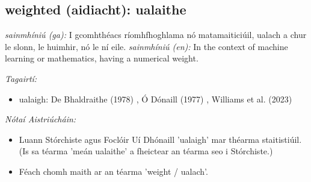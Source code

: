 \documentclass{article}
\begin{document}
\subsection*{weighted (aidiacht): ualaithe} 
 \noindent \textit{sainmhíniú (ga):} I gcomhthéacs ríomhfhoghlama nó matamaiticiúil, ualach a chur le slonn, le huimhir, nó le ní eile.
\newline\newline
 \noindent \textit{sainmhíniú (en):} In the context of machine learning or mathematics, having a numerical weight.
\newline

 \noindent \textit{Tagairtí:}
\begin{itemize}
	\item ualaigh: De Bhaldraithe (1978) \cite{de-bhaldraithe}, Ó Dónaill (1977) \cite{odonaill}, Williams et al. (2023) \cite{storchiste}
\end{itemize}

 \noindent \textit{Nótaí Aistriúcháin:}
\begin{itemize}
	\item Luann Stórchiste agus Foclóir Uí Dhónaill 'ualaigh' mar théarma staitistiúil. (Is sa téarma 'meán ualaithe' a fheictear an téarma seo i Stórchiste.)
	\item Féach chomh maith ar an téarma 'weight / ualach'.
\end{itemize}



            \newpage
            \printbibliography[
                title={Tagairtí},
                heading=bibintoc
            ]
            
\end{document}
